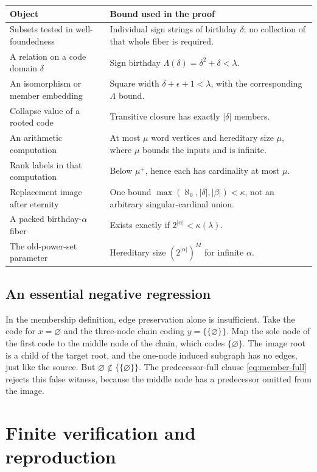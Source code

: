 \documentclass[11pt,letterpaper]{article}
\theoremstyle{definition}
\theoremstyle{remark}
\newcommand{\card}[1]{\lvert#1\rvert}
\begin{document}
\begin{longtable}{@{}P{0.35\textwidth}P{0.56\textwidth}@{}}
\toprule
Object & Bound used in the proof\\
\midrule\endhead
Subsets tested in well-foundedness & Individual sign strings of birthday $\delta$; no collection of that whole fiber is required.\\[0.4em]
A relation on a code domain $\delta$ & Sign birthday $\Lambda(\delta)=\delta^2+\delta<\lambda$.\\[0.4em]
An isomorphism or member embedding & Square width $\delta+\epsilon+1<\lambda$, with the corresponding $\Lambda$ bound.\\[0.4em]
Collapse value of a rooted code & Transitive closure has exactly $\card\delta$ members.\\[0.4em]
An arithmetic computation & At most $\mu$ word vertices and hereditary size $\mu$, where $\mu$ bounds the inputs and is infinite.\\[0.4em]
Rank labels in that computation & Below $\mu^+$, hence each has cardinality at most $\mu$.\\[0.4em]
Replacement image after eternity & One bound $\max(\aleph_0,\card\delta,\card\beta)<\kappa$, not an arbitrary singular-cardinal union.\\[0.4em]
A packed birthday-$\alpha$ fiber & Exists exactly if $2^{\card\alpha}<\kappa(\lambda)$.\\[0.4em]
The old-power-set parameter & Hereditary size $(2^{\card\alpha})^M$ for infinite $\alpha$.\\
\bottomrule
\end{longtable}

\subsection{An essential negative regression}

In the membership definition, edge preservation alone is insufficient.
Take the code for $x=\varnothing$ and the three-node chain coding
$y=\{\{\varnothing\}\}$. Map the sole node of the first code to the middle
node of the chain, which codes $\{\varnothing\}$. The image root is a child
of the target root, and the one-node induced subgraph has no edges, just
like the source. But $\varnothing\notin\{\{\varnothing\}\}$.
The predecessor-full clause \eqref{eq:member-full} rejects this false
witness, because the middle node has a predecessor omitted from the image.

\section{Finite verification and reproduction}
\label{app:verification}
\end{document}
